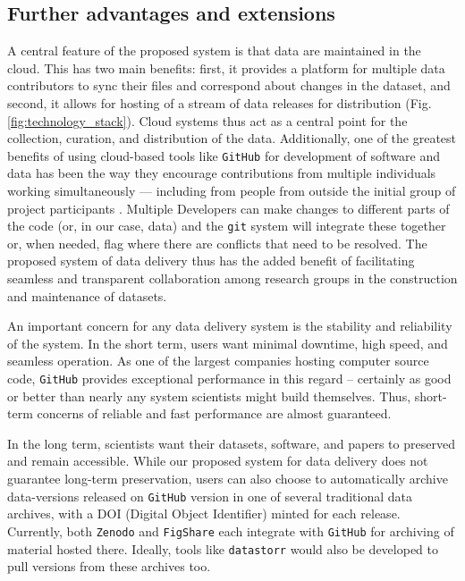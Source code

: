 \documentclass[a4paper,num-refs]{assets/oup-contemporary}
\begin{document}
\subsection{Further advantages and extensions}

A central feature of the proposed system is that data are maintained in the cloud. This has two main benefits: first, it provides a platform for multiple data contributors to sync their files and correspond about changes in the dataset, and second, it allows for hosting of a stream of data releases for distribution (Fig. \ref{fig:technology_stack}). Cloud systems thus act as a central point for the collection, curation, and distribution of the data. Additionally, one of the greatest benefits of using cloud-based tools like  \texttt{GitHub} for development of software and data has been the way they encourage contributions from multiple individuals working simultaneously --- including from people from outside the initial group of project participants \cite{Rogers-2013, Perkel-2016}. Multiple Developers can make changes to different parts of the code (or, in our case, data) and the \texttt{git} system will integrate these together or, when needed, flag where there are conflicts that need to be resolved. The proposed system of data delivery thus has the added benefit of facilitating seamless and transparent collaboration among research groups in the construction and maintenance of datasets.

An important concern for any data delivery system is the stability and reliability of the system. In the short term, users want minimal downtime, high speed, and seamless operation. As one of the largest companies hosting computer source code, \texttt{GitHub} provides exceptional performance in this regard -- certainly as good or better than nearly any system scientists might build themselves. Thus, short-term concerns of reliable and fast performance are almost guaranteed.

In the long term, scientists want their datasets, software, and papers to preserved and remain accessible. While our proposed system for data delivery does not guarantee long-term preservation, users can also choose to automatically archive data-versions released on \texttt{GitHub} version in one of several traditional data archives, with a DOI (Digital Object Identifier) minted for each release. Currently, both \texttt{Zenodo} and  \texttt{FigShare} each integrate with \texttt{GitHub} for archiving of material hosted there. Ideally, tools like \texttt{datastorr} would also be developed to pull versions from these archives too. 
\end{document}
